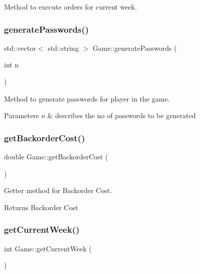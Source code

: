 Method to execute orders for current week. 

\mbox{\label{class_game_aa083541e01feec6694497e8c6eb5ffe8}} 
\subsubsection{\texorpdfstring{generate\+Passwords()}{generatePasswords()}}
{\footnotesize\ttfamily std\+::vector$<$ std\+::string $>$ Game\+::generate\+Passwords (\begin{DoxyParamCaption}\item[{int}]{n }\end{DoxyParamCaption})}



Method to generate passwords for player in the game. 


\begin{DoxyParams}{Parameters}
{\em n} & describes the no of passwords to be generated \\
\hline
\end{DoxyParams}
\mbox{\label{class_game_ab29ec1e3f5dd71e0f67b3bda884ff166}} 
\subsubsection{\texorpdfstring{get\+Backorder\+Cost()}{getBackorderCost()}}
{\footnotesize\ttfamily double Game\+::get\+Backorder\+Cost (\begin{DoxyParamCaption}{ }\end{DoxyParamCaption})}



Getter method for Backorder Cost. 

\begin{DoxyReturn}{Returns}
Backorder Cost 
\end{DoxyReturn}
\mbox{\label{class_game_aa131c51d4b09434ec8986048483ef17e}} 
\subsubsection{\texorpdfstring{get\+Current\+Week()}{getCurrentWeek()}}
{\footnotesize\ttfamily int Game\+::get\+Current\+Week (\begin{DoxyParamCaption}{ }\end{DoxyParamCaption})}



